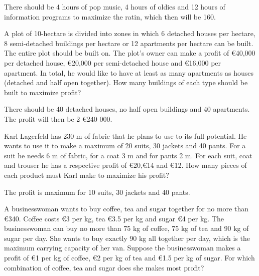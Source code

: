 \begin{Answer}
    There should be 4 hours of pop music, 4 hours of oldies and 12 hours of information programs  to maximize the ratin, which then will be 160.
\end{Answer}

\begin{Exercise}[difficulty = 2] A  plot of 10-hectare  is divided into zones in which 6 detached houses per hectare, 8 semi-detached buildings per hectare or 12 apartments per hectare can be built. The entire plot should be built on. The plot's owner can make a profit of \euro 40,000 per detached house,  \euro 20,000 per semi-detached house and  \euro 16,000 per apartment. In total, he would like to have at least as many apartments as houses (detached and half open together). How many buildings of each type should be built to maximize profit?
\end{Exercise}

\begin{Answer}
    There should be 40 detached houses, no half open buildings and 40 apartments. The profit will then be 2 \euro 240 000.
\end{Answer}

\begin{Exercise}[difficulty = 2] Karl Lagerfeld has 230 m of fabric that he plans to use to its full potential. He wants to use it to make a maximum of 20 suits, 30 jackets and 40 pants. For a suit he needs 6 m of fabric, for a coat 3 m and for pants 2 m. For each suit, coat and trouser he has a respective profit of \euro20,\euro14 and \euro12. How many pieces of each product must Karl make to maximize his profit? 
\end{Exercise}

\begin{Answer}
    The profit is maximum for 10 suits, 30 jackets and 40 pants.
\end{Answer}

\begin{Exercise}[difficulty = 2] A  businesswoman wants to buy coffee, tea and sugar together for no more than \euro 340. Coffee costs \euro 3 per kg, tea \euro 3.5 per kg and sugar \euro 4 per kg. The businesswoman can buy no more than 75 kg of coffee, 75 kg of tea and  90 kg of sugar per day. She wants to buy exactly 90 kg all together per day, which is the maximum carrying capacity of her van. Suppose the businesswoman makes a profit of \euro1 per kg of coffee, \euro2 per kg of tea and \euro1.5 per kg of sugar. For which combination of coffee, tea and sugar does she makes most profit?
\end{Exercise}

